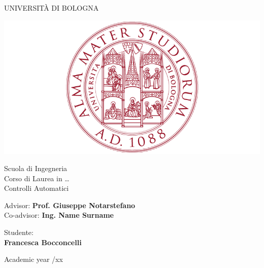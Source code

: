 \documentclass[a4paper,11pt,oneside]{book}
\begin{document}
\pagestyle{myheadings}

\thispagestyle{empty}                                                 
\begin{center}                                                            
    \vspace{5mm}
    {\LARGE UNIVERSIT\`A DI BOLOGNA} \\                       
      \vspace{5mm}
\end{center}
\begin{center}
  \includegraphics[scale=.27]{figs/logo_unibo}
\end{center}
\begin{center}
      \vspace{5mm}
      {\LARGE Scuola di Ingegneria} \\
        \vspace{3mm}
      {\Large Corso di Laurea in \dots} \\
      \vspace{20mm}
      {\LARGE Controlli Automatici} \\
      \vspace{15mm}
\end{center}
\begin{flushleft}                                                                              
     {\large Advisor: \textbf{\@ Prof. Giuseppe Notarstefano}} \\        
     \vspace{3mm}
     {\large Co-advisor: \textbf{\@ Ing. Name Surname}} \\        
     \vspace{13mm}
\end{flushleft}
\begin{flushright}
      {\large Studente:}\\
      \vspace{3mm}
      \textbf{\@ Francesca Bocconcelli}
\end{flushright}        %
\begin{center}
\vfill
      {\large Academic year \@xx/xx} \\
\end{center}
\end{document}
